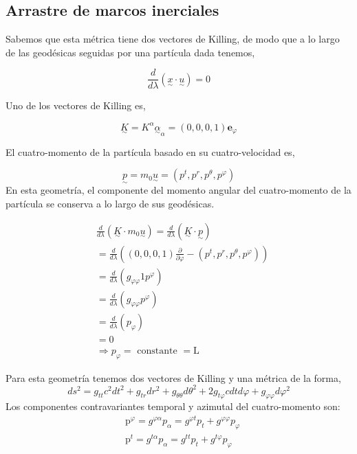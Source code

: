 \subsection{Arrastre de marcos inerciales}

Sabemos que esta métrica tiene dos vectores de Killing, de modo que a lo largo de las geodésicas seguidas por una partícula dada tenemos,

$$
    \frac{d}{d \lambda}({\underset{\sim}{x}} \cdot \underset{\sim}{u})=0
$$

Uno de los vectores de Killing es,

$$
    \underset{\sim}{K}=K^\alpha{\underset{\sim}{\alpha}}_\alpha=(0,0,0,1) \mathbf{e}_\varphi
$$

El cuatro-momento de la partícula basado en su cuatro-velocidad es,

$$
    \underset{\sim}{p}=m_0 \underset{\sim}{u}=\left(p^t, p^r, p^\theta, p^{\varphi}\right)
$$
En esta geometría, el componente del momento angular del cuatro-momento de la partícula se conserva a lo largo de sus geodésicas.


\begin{align}
     & \frac{d}{d \lambda}\left(\underset{\sim}{K} \cdot m_0 \underset{\sim}{u}\right)=\frac{d}{d \lambda}(\underset{\sim}{K} \cdot \underset{\sim}{p}) \\
     & =\frac{d}{d \lambda}\left((0,0,0,1) \frac{\partial}{\partial \varphi}-\left(p^t, p^r, p^\theta, p^{\varphi}\right)\right)                        \\
     & =\frac{d}{d \lambda}\left(g_{\varphi \varphi} 1 p^{\varphi}\right)                                                                               \\
     & =\frac{d}{d \lambda}\left(g_{\varphi \varphi} p^{\varphi}\right)                                                                                 \\
     & =\frac{d}{d \lambda}\left(p_{\varphi}\right)                                                                                                     \\
     & =0                                                                                                                                               \\
     & \Rightarrow p_{\varphi}=\text { constante }=\mathrm{L}
\end{align}

Para esta geometría tenemos dos vectores de Killing y una métrica de la forma,
$$
    d s^2=g_{t t} c^2 d t^2+g_{t r} d r^2+g_{\theta \theta} d \theta^2+2 g_{t \varphi} c d t d \varphi+g_{\varphi \varphi} d \varphi^2
$$
Los componentes contravariantes temporal y azimutal del cuatro-momento son:
\begin{align}
     & \mathrm{p}^{\varphi}=g^{\varphi \alpha} p_\alpha=g^{\varphi t} p_t+g^{\varphi \varphi} p_{\varphi} \\
     & \mathrm{p}^t=g^{t \alpha} p_\alpha=g^{t t} p_t+g^{t \varphi} p_{\varphi}
\end{align}


